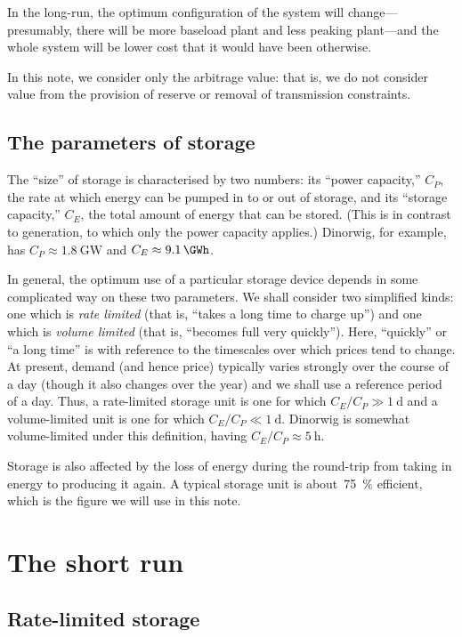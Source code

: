 \documentclass[12pt, a4paper]{article}
\begin{document}
In the long-run, the optimum configuration of the system will
change---presumably, there will be more baseload plant and less
peaking plant---and the whole system will be lower cost that it would
have been otherwise. 

In this note, we consider only the arbitrage value: that is, we do not
consider value from the provision of reserve or removal of
transmission constraints.

\subsection{The parameters of storage}

The ``size'' of storage is characterised by two numbers: its ``power
capacity,'' $C_P$, the rate at which energy can be pumped in to or out
of storage, and its ``storage capacity,'' $C_E$, the total amount of
energy that can be stored. (This is in contrast to generation, to
which only the power capacity applies.) Dinorwig, for example, has
$C_P \approx \SI{1.8}{\GW}$ and $C_E\approx \SI{9.1}{\GWh}$.

In general, the optimum use of a particular storage device depends in
some complicated way on these two parameters. We shall consider two
simplified kinds: one which is \emph{rate limited} (that is, ``takes a
long time to charge up'') and one which is \emph{volume limited}
(that is, ``becomes full very quickly''). Here, ``quickly'' or ``a
long time'' is with reference to the timescales over which prices tend
to change. At present, demand (and hence price) typically varies
strongly over the course of a day (though it also changes over the
year) and we shall use a reference period of a day. Thus, a
rate-limited storage unit is one for which $C_E/C_P \gg \SI{1}{\day}$
and a volume-limited unit is one for which $C_E/C_P \ll
\SI{1}{\day}$. Dinorwig is somewhat volume-limited under this
definition, having $C_E/C_P \approx \SI{5}{\hour}$.

Storage is also affected by the loss of energy during the round-trip
from taking in energy to producing it again. A typical storage unit is
about~\SI{75}{\percent} efficient, which is the figure we will use in
this note.


\section{The short run}

\subsection{Rate-limited storage}
\end{document}
